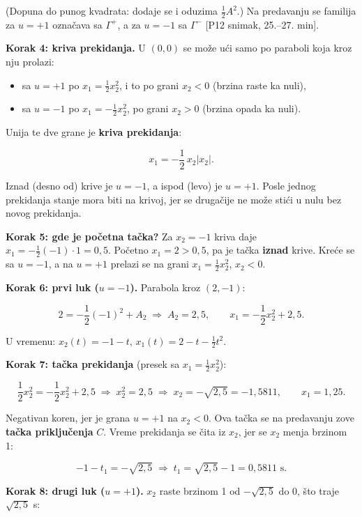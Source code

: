 \documentclass[11pt,a4paper,parskip=half,headsepline,numbers=noenddot]{scrartcl}
\DeclareRobustCommand{\izvor}[1]{{\small\color{izvorC}[#1]}}
\begin{document}
(Dopuna do punog kvadrata: dodaje se i oduzima \(\frac12A^2\).) Na predavanju se familija za \(u = +1\) označava sa \(\Gamma^+\), a za \(u = -1\) sa \(\Gamma^-\) \izvor{P12 snimak, 25.--27. min}.

\textbf{Korak 4: kriva prekidanja.} U \((0, 0)\) se može ući samo po paraboli koja kroz nju prolazi:

\begin{itemize}
\item sa \(u = +1\) po \(x_1 = \frac12x_2^2\), i to po grani \(x_2 < 0\) (brzina raste ka nuli),
\item sa \(u = -1\) po \(x_1 = -\frac12x_2^2\), po grani \(x_2 > 0\) (brzina opada ka nuli).
\end{itemize}

Unija te dve grane je \textbf{kriva prekidanja}:

\[x_1 = -\frac12\,x_2|x_2| .\]

Iznad (desno od) krive je \(u = -1\), a ispod (levo) je \(u = +1\). Posle jednog prekidanja stanje mora biti na krivoj, jer se drugačije ne može stići u nulu bez novog prekidanja.

\textbf{Korak 5: gde je početna tačka?} Za \(x_2 = -1\) kriva daje \(x_1 = -\frac12(-1)\cdot1 = 0{,}5\). Početno \(x_1 = 2 > 0{,}5\), pa je tačka \textbf{iznad} krive. Kreće se sa \(u = -1\), a na \(u = +1\) prelazi se na grani \(x_1 = \frac12x_2^2\), \(x_2 < 0\).

\textbf{Korak 6: prvi luk (\(u = -1\)).} Parabola kroz \((2, -1)\):

\[2 = -\frac12(-1)^2 + A_2 \;\Rightarrow\; A_2 = 2{,}5, \qquad x_1 = -\frac12x_2^2 + 2{,}5 .\]

U vremenu: \(x_2(t) = -1 - t\), \(x_1(t) = 2 - t - \frac12t^2\).

\textbf{Korak 7: tačka prekidanja} (presek sa \(x_1 = \frac12x_2^2\)):

\[\frac12x_2^2 = -\frac12x_2^2 + 2{,}5 \;\Rightarrow\; x_2^2 = 2{,}5 \;\Rightarrow\; x_2 = -\sqrt{2{,}5} = -1{,}5811, \qquad x_1 = 1{,}25 .\]

Negativan koren, jer je grana \(u = +1\) na \(x_2 < 0\). Ova tačka se na predavanju zove \textbf{tačka priključenja} \(C\). Vreme prekidanja se čita iz \(x_2\), jer se \(x_2\) menja brzinom 1:

\[-1 - t_1 = -\sqrt{2{,}5} \;\Rightarrow\; t_1 = \sqrt{2{,}5} - 1 = 0{,}5811 \text{ s} .\]

\textbf{Korak 8: drugi luk (\(u = +1\)).} \(x_2\) raste brzinom 1 od \(-\sqrt{2{,}5}\) do 0, što traje \(\sqrt{2{,}5}\) s:
\end{document}
